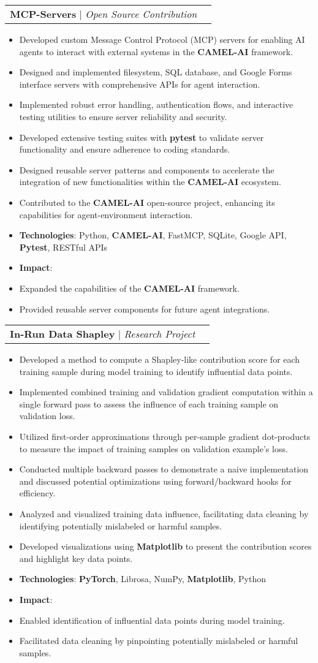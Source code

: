 \documentclass[letterpaper,11pt]{article}
\makeatletter
\newcommand{\resumeItem}[1]{
  \item\small{
    {#1 \vspace{-2pt}}
  }
}
\newcommand{\resumeProjectHeading}[2]{
    \item
    \begin{tabular*}{0.97\textwidth}{l@{\extracolsep{\fill}}r}
      \small#1 & #2 \\
    \end{tabular*}\vspace{-7pt}
}
\newcommand{\resumeItemListStart}{\begin{itemize}}
\newcommand{\resumeItemListEnd}{\end{itemize}\vspace{-5pt}}
\makeatother
\begin{document}
\resumeProjectHeading
    {\textbf{MCP-Servers} $|$ \emph{Open Source Contribution}}{}
    \resumeItemListStart
        \resumeItem{Developed custom Message Control Protocol (MCP) servers for enabling AI agents to interact with external systems in the \textbf{CAMEL-AI} framework.}
        \resumeItem{Designed and implemented filesystem, SQL database, and Google Forms interface servers with comprehensive APIs for agent interaction.}
        \resumeItem{Implemented robust error handling, authentication flows, and interactive testing utilities to ensure server reliability and security.}
        \resumeItem{Developed extensive testing suites with \textbf{pytest} to validate server functionality and ensure adherence to coding standards.}
        \resumeItem{Designed reusable server patterns and components to accelerate the integration of new functionalities within the \textbf{CAMEL-AI} ecosystem.}
        \resumeItem{Contributed to the \textbf{CAMEL-AI} open-source project, enhancing its capabilities for agent-environment interaction.}
        \resumeItem{\textbf{Technologies}: Python, \textbf{CAMEL-AI}, FastMCP, SQLite, Google API, \textbf{Pytest}, RESTful APIs}
        \resumeItem{\textbf{Impact}:}
        \resumeItem{Expanded the capabilities of the \textbf{CAMEL-AI} framework.}
        \resumeItem{Provided reusable server components for future agent integrations.}
    \resumeItemListEnd


    \resumeProjectHeading
        {\textbf{In-Run Data Shapley} $|$ \emph{Research Project}}{}
        \resumeItemListStart
            \resumeItem{Developed a method to compute a Shapley-like contribution score for each training sample during model training to identify influential data points.}
            \resumeItem{Implemented combined training and validation gradient computation within a single forward pass to assess the influence of each training sample on validation loss.}
            \resumeItem{Utilized first-order approximations through per-sample gradient dot-products to measure the impact of training samples on validation example’s loss.}
            \resumeItem{Conducted multiple backward passes to demonstrate a naive implementation and discussed potential optimizations using forward/backward hooks for efficiency.}
            \resumeItem{Analyzed and visualized training data influence, facilitating data cleaning by identifying potentially mislabeled or harmful samples.}
            \resumeItem{Developed visualizations using \textbf{Matplotlib} to present the contribution scores and highlight key data points.}
            \resumeItem{\textbf{Technologies}: \textbf{PyTorch}, Librosa, NumPy, \textbf{Matplotlib}, Python}
            \resumeItem{\textbf{Impact}:}
            \resumeItem{Enabled identification of influential data points during model training.}
            \resumeItem{Facilitated data cleaning by pinpointing potentially mislabeled or harmful samples.}
        \resumeItemListEnd
\end{document}
